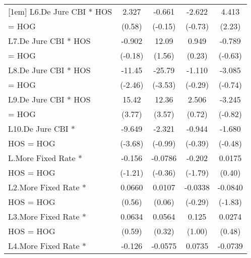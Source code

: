 {\begin{tabular}{l*{4}{c}}
[1em]
L6.De Jure CBI * HOS&       2.327         &      -0.661         &      -2.622         &       4.413\sym{*}  \\
= HOG               &      (0.58)         &     (-0.15)         &     (-0.73)         &      (2.23)         \\
[1em]
L7.De Jure CBI * HOS&      -0.902         &       12.09         &       0.949         &      -0.789         \\
= HOG               &     (-0.18)         &      (1.56)         &      (0.23)         &     (-0.63)         \\
[1em]
L8.De Jure CBI * HOS&      -11.45\sym{*}  &      -25.79\sym{***}&      -1.110         &      -3.085         \\
= HOG               &     (-2.46)         &     (-3.53)         &     (-0.29)         &     (-0.74)         \\
[1em]
L9.De Jure CBI * HOS&       15.42\sym{***}&       12.36\sym{***}&       2.506         &      -3.245         \\
= HOG               &      (3.77)         &      (3.57)         &      (0.72)         &     (-0.82)         \\
[1em]
L10.De Jure CBI *   &      -9.649\sym{***}&      -2.321         &      -0.944         &      -1.680         \\
HOS = HOG           &     (-3.68)         &     (-0.99)         &     (-0.39)         &     (-0.48)         \\
[1em]
L.More Fixed Rate * &      -0.156         &     -0.0786         &      -0.202         &      0.0175         \\
HOS = HOG           &     (-1.21)         &     (-0.36)         &     (-1.79)         &      (0.40)         \\
[1em]
L2.More Fixed Rate *&      0.0660         &      0.0107         &     -0.0338         &     -0.0840         \\
HOS = HOG           &      (0.56)         &      (0.06)         &     (-0.29)         &     (-1.83)         \\
[1em]
L3.More Fixed Rate *&      0.0634         &      0.0564         &       0.125         &      0.0274         \\
HOS = HOG           &      (0.59)         &      (0.32)         &      (1.00)         &      (0.48)         \\
[1em]
L4.More Fixed Rate *&      -0.126         &     -0.0575         &      0.0735         &     -0.0739\sym{*}  \\

\end{tabular}}
